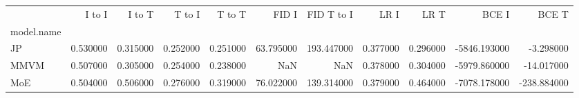 \begin{tabular}{lrrrrrrrrrr}
\toprule
 & I to I & I to T & T to I & T to T & FID I & FID T to I & LR I & LR T & BCE I & BCE T \\
model.name &  &  &  &  &  &  &  &  &  &  \\
\midrule
JP & 0.530000 & 0.315000 & 0.252000 & 0.251000 & 63.795000 & 193.447000 & 0.377000 & 0.296000 & -5846.193000 & -3.298000 \\
MMVM & 0.507000 & 0.305000 & 0.254000 & 0.238000 & NaN & NaN & 0.378000 & 0.304000 & -5979.860000 & -14.017000 \\
MoE & 0.504000 & 0.506000 & 0.276000 & 0.319000 & 76.022000 & 139.314000 & 0.379000 & 0.464000 & -7078.178000 & -238.884000 \\
\bottomrule
\end{tabular}

